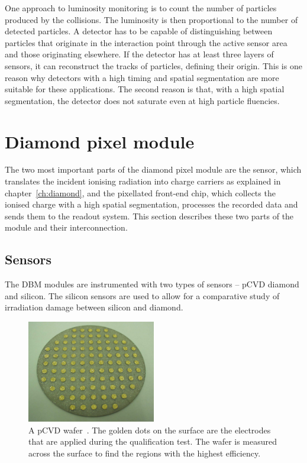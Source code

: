 One approach to luminosity monitoring is to count the number of particles produced by the collisions. The luminosity is then proportional to the number of detected particles. A detector has to be capable of distinguishing between particles that originate in the interaction point through the active sensor area and those originating elsewhere. If the detector has at least three layers of sensors, it can reconstruct the tracks of particles, defining their origin. This is one reason why detectors with a high timing and spatial segmentation are more suitable for these applications. The second reason is that, with a high spatial segmentation, the detector does not saturate even at high particle fluencies.





\section{Diamond pixel module}
\label{sec:atlasdbm}
The two most important parts of the diamond pixel module are the sensor, which translates the incident ionising radiation into charge carriers as explained in chapter~\ref{ch:diamond}, and the pixellated front-end chip, which collects the ionised charge with a high spatial segmentation, processes the recorded data and sends them to the readout system. This section describes these two parts of the module and their interconnection.

\subsection{Sensors}
The DBM modules are instrumented with two types of sensors -- pCVD diamond and silicon. The silicon sensors are used to allow for a comparative study of irradiation damage between silicon and diamond.
\begin{figure}[!t]
\centering
\includegraphics[width=0.5\textwidth]{04_charge_monitoring/pics/wafer}
\caption{A pCVD wafer~\cite{RADSEN:00001}. The golden dots on the surface are the electrodes that are applied during the qualification test. The wafer is measured across the surface to find the regions with the highest efficiency.}
\label{fig:wafer}
\end{figure}


